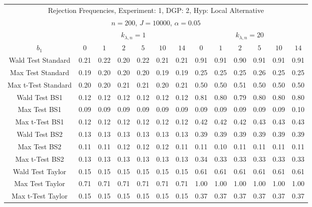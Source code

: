  \begin{table}[H] 
 \singlespacing 
 \tiny 
 \centering 
\begin{tabular}{c|cccccc|cccccc} 
\multicolumn{13}{c}{ Rejection Frequencies, Experiment: 1, DGP: 2, Hyp: Local Alternative } \\ 
\multicolumn{13}{c}{ $n=200$, $J=10000$, $\alpha = 0.05$ } \\ 
  \multicolumn{1}{c}{} & \multicolumn{6}{c}{ $k_{\lambda,n}=1$ } & \multicolumn{6}{c}{ $k_{\lambda,n}=20$ } \\ 
 \hline 
 $b_{1}$ & $0$ & $1$ & $2$ & $5$ & $10$ & $14$ & $0$ & $1$ & $2$ & $5$ & $10$ & $14$   \\ 
 \hline 
 \hline 
 Wald Test Standard &  0.21 &  0.22 &  0.20 &  0.22 &  0.21 &  0.21 &  0.91 &  0.91 &  0.90 &  0.91 &  0.91 &  0.91 \\ 
 Max Test Standard &  0.19 &  0.20 &  0.20 &  0.20 &  0.19 &  0.19 &  0.25 &  0.25 &  0.25 &  0.26 &  0.25 &  0.25 \\ 
 Max t-Test Standard &  0.20 &  0.20 &  0.21 &  0.21 &  0.20 &  0.21 &  0.50 &  0.50 &  0.51 &  0.50 &  0.50 &  0.50 \\ 
 \hline 
 Wald Test BS1 &  0.12 &  0.12 &  0.12 &  0.12 &  0.12 &  0.12 &  0.81 &  0.80 &  0.79 &  0.80 &  0.80 &  0.80 \\ 
 Max Test BS1 &  0.09 &  0.09 &  0.09 &  0.09 &  0.09 &  0.09 &  0.09 &  0.09 &  0.09 &  0.09 &  0.09 &  0.10 \\ 
 Max t-Test BS1 &  0.12 &  0.12 &  0.12 &  0.12 &  0.12 &  0.12 &  0.42 &  0.42 &  0.42 &  0.43 &  0.43 &  0.43 \\ 
 \hline 
 Wald Test BS2 &  0.13 &  0.13 &  0.13 &  0.13 &  0.13 &  0.13 &  0.39 &  0.39 &  0.39 &  0.39 &  0.39 &  0.39 \\ 
 Max Test BS2 &  0.11 &  0.11 &  0.12 &  0.12 &  0.12 &  0.11 &  0.11 &  0.10 &  0.11 &  0.11 &  0.11 &  0.11 \\ 
 Max t-Test BS2 &  0.13 &  0.13 &  0.13 &  0.13 &  0.13 &  0.13 &  0.34 &  0.33 &  0.33 &  0.33 &  0.33 &  0.33 \\ 
 \hline 
 Wald Test Taylor &  0.15 &  0.15 &  0.15 &  0.15 &  0.15 &  0.15 &  0.61 &  0.61 &  0.61 &  0.61 &  0.61 &  0.61 \\ 
 Max Test Taylor &  0.71 &  0.71 &  0.71 &  0.71 &  0.71 &  0.71 &  1.00 &  1.00 &  1.00 &  1.00 &  1.00 &  1.00 \\ 
 Max t-Test Taylor &  0.15 &  0.15 &  0.15 &  0.15 &  0.15 &  0.15 &  0.37 &  0.37 &  0.37 &  0.37 &  0.37 &  0.37 \\ 
 \hline 
\end{tabular}
 \end{table}

